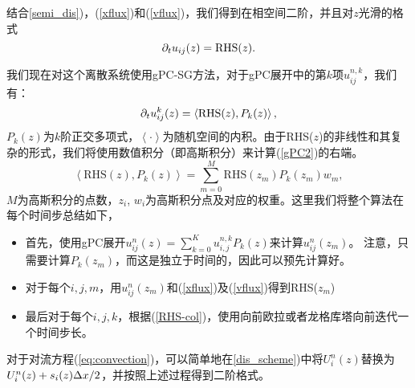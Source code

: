 结合\ref{semi_dis})，(\ref{xflux})和(\ref{vflux})，我们得到在相空间二阶，并且对$z$光滑的格式 
\begin{equation}
  \partial_t u_{ij}(z) = \mathrm{RHS}(z).
\end{equation}

我们现在对这个离散系统使用gPC-SG方法，对于gPC展开中的第$k$项$u^{n,k}_{ij}$，我们有：
\begin{equation} \label{gPC2}
  \partial_t u^{k}_{ij}(z) = \left<\mathrm{RHS}(z),P_k(z)\right>,
\end{equation}
$P_k(z)$为$k$阶正交多项式，$\left<\cdot\right>$为随机空间的内积。由于RHS($z$)的非线性和其复杂的形式，我们将使用数值积分（即高斯积分）来计算(\ref{gPC2})的右端。
\begin{equation}\label{RHS-col}
  \left<\mathrm{RHS}(z),P_k(z)\right> = \sum_{m=0}^{M}\mathrm{RHS}(z_m)P_k(z_m)w_m,
\end{equation}
$M$为高斯积分的点数，$z_i$, $w_i$为高斯积分点及对应的权重。这里我们将整个算法在每个时间步总结如下，
\begin{itemize}
  \item 首先，使用gPC展开$u^n_{ij}(z) = \sum\limits_{k=0}^K u^{n,k}_{i,j}P_k(z)$来计算$u^n_{ij}(z_m)$。 注意，只需要计算$P_k(z_m)$，而这是独立于时间的，因此可以预先计算好。
  \item 对于每个$i,j,m$，用$u^n_{ij}(z_m)$和(\ref{xflux})及(\ref{vflux})得到RHS($z_m$)
  \item 最后对于每个$i,j,k$，根据(\ref{RHS-col})，使用向前欧拉或者龙格库塔向前迭代一个时间步长。
\end{itemize}
 
\begin{rem}
  对于对流方程(\ref{eq:convection})，可以简单地在\ref{dis_scheme})中将$U_i^n(z)$替换为$U_i^n(z) + s_i(z)\Delta x/2$，并按照上述过程得到二阶格式。
\end{rem}
